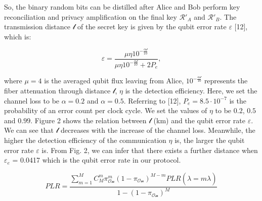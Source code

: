 \documentclass[a4paper,11pt]{article}
\begin{document}
So, the binary random bits can be distilled after Alice and Bob perform key reconciliation and privacy amplification on the final key $\mathcal{R}'_A$ and $\mathcal{R}'_B$. The transmission distance $\mathcal{l}$ of the secret key is given by the qubit error rate $\varepsilon$ [12], which is:

\begin{equation*}
\varepsilon = \dfrac{\mu \eta 10^{- \frac{\alpha \mathcal{l}}{10}}}{\mu \eta 10^{- \frac{\alpha \mathcal{l}}{10}} + 2P_e}, 
\end{equation*}

where $\mu = 4$ is the averaged qubit flux leaving from Alice, $10^{- \frac{\alpha \mathcal{l}}{10}}$ represents the fiber attenuation through distance $\mathcal{l}$,
$\eta$ is the detection efficiency. Here, we set the channel loss to be $\alpha = 0.2$ and
$\alpha = 0.5$. Referring to [12], $P_e = 8.5 \cdot 10^{−7}$ is the probability of an error count per clock cycle. We set the values of $\eta$ to be $0.2$, $0.5$ and $0.99$.
Figure 2 shows the relation between $\mathcal{l}$ (km) and the qubit error rate $\varepsilon$. We can see that $\mathcal{l}$ decreases with the increase of the channel loss. Meanwhile, the higher the detection efficiency of the communication $\eta$ is, the larger the qubit error rate $\varepsilon$ is. From Fig. 2, we can infer that there exists a further distance when $\varepsilon_e$ = 0.0417 which is the qubit error rate in our protocol.

\begin{equation*}
 PLR = \dfrac{\sum_{m=1}^M C_M^m \pi_{\mathcal{On}}^m (1 - \pi_{\mathcal{On}})^{M-m} PLR (\hat{\lambda} = m\lambda)}
 {1 - (1 -\pi_{\mathcal{On}})^M}
\end{equation*}
\end{document}
